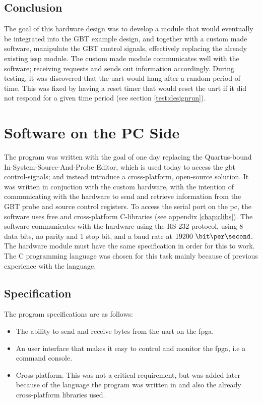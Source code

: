 \documentclass[main.tex]{subfiles}
\begin{document}
\subsection{Conclusion}

The goal of this hardware design was to develop a module that would eventually be integrated into the GBT example design, and together with a custom made software, manipulate the GBT control signals, effectively replacing the already existing \gls{issp} module. The custom made module communicates well with the software; receiving requests and sends out information accordingly. During testing, it was discovered that the \gls{uart} would hang after a random period of time. This was fixed by having a reset timer that would reset the \gls{uart} if it did not respond for a given time period (see section \ref{test:designrun}).

\section{Software on the PC Side} \label{chap:software}

The program was written with the goal of one day replacing the Quartus-bound In-System-Source-And-Probe Editor, which is used today to access the \gls{gbt} control-signals; and instead introduce a cross-platform, open-source solution. It was written in conjuction with the custom hardware, with the intention of communicating with the hardware to send and retrieve information from the GBT probe and source control registers. To access the serial port on the \acrshort{pc}, the software uses free and cross-platform C-libraries (see appendix \ref{chap:clibs}). The software communicates with the hardware using the RS-232 protocol, using 8 data bits, no parity and 1 stop bit, and a baud rate at $19200~\bit\per\second$. The hardware module must have the same specification in order for this to work. The C programming language was chosen for this task mainly because of previous experience with the language.

\subsection{Specification}

The program specifications are as follows:\\
\begin{itemize} \setlength{\itemsep}{10pt}
\item The ability to send and receive bytes from the \gls{uart} on the \gls{fpga}. 
\item An user interface that makes it easy to control and monitor the \gls{fpga}, i.e a command console.
\item Cross-platform. This was not a critical requirement, but was added later because of the language the program was written in and also the already cross-platform libraries used. 
\end{itemize}
\end{document}
